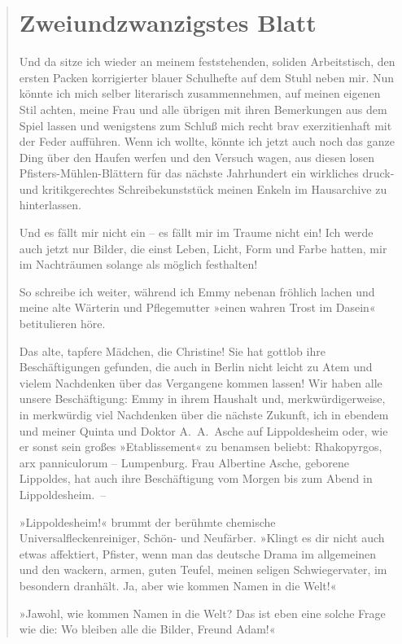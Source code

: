 \begin{verse}
\section{Zweiundzwanzigstes Blatt}

Und da sitze ich wieder an meinem feststehenden, soliden
Arbeitstisch, den ersten Packen korrigierter blauer Schulhefte auf
dem Stuhl neben mir. Nun könnte ich mich selber literarisch
zusammennehmen, auf meinen eigenen Stil achten, meine Frau und alle
übrigen mit ihren Bemerkungen aus dem Spiel lassen und wenigstens
zum Schluß mich recht brav exerzitienhaft mit der Feder aufführen.
Wenn ich wollte, könnte ich jetzt auch noch das ganze Ding über den
Haufen werfen und den Versuch wagen, aus diesen losen
Pfisters-Mühlen-Blättern für das nächste Jahrhundert ein wirkliches
druck- und kritikgerechtes Schreibekunststück meinen Enkeln im
Hausarchive zu hinterlassen.

Und es fällt mir nicht ein – es fällt mir im Traume nicht ein! Ich
werde auch jetzt nur Bilder, die einst Leben, Licht, Form und Farbe
hatten, mir im Nachträumen solange als möglich festhalten!

So schreibe ich weiter, während ich Emmy nebenan fröhlich lachen
und meine alte Wärterin und Pflegemutter »einen wahren Trost im
Dasein« betitulieren höre.

Das alte, tapfere Mädchen, die Christine! Sie hat gottlob ihre
Beschäftigungen gefunden, die auch in Berlin nicht leicht zu Atem
und vielem Nachdenken über das Vergangene kommen lassen! Wir haben
alle unsere Beschäftigung: Emmy in ihrem Haushalt und,
merkwürdigerweise, in merkwürdig viel Nachdenken über die nächste
Zukunft, ich in ebendem und meiner Quinta und Doktor A.~A.~Asche
auf Lippoldesheim oder, wie er sonst sein großes »Etablissement« zu
benamsen beliebt: Rhakopyrgos, arx panniculorum – Lumpenburg. Frau
Albertine Asche, geborene Lippoldes, hat auch ihre Beschäftigung
vom Morgen bis zum Abend in Lippoldesheim.~–

»Lippoldesheim!« brummt der berühmte chemische
Universalfleckenreiniger, Schön- und Neufärber. »Klingt es dir
nicht auch etwas affektiert, Pfister, wenn man das deutsche Drama
im allgemeinen und den wackern, armen, guten Teufel, meinen seligen
Schwiegervater, im besondern dranhält. Ja, aber wie kommen Namen in
die Welt!«

»Jawohl, wie kommen Namen in die Welt? Das ist eben eine solche
Frage wie die: Wo bleiben alle die Bilder, Freund Adam!«


\end{verse}
